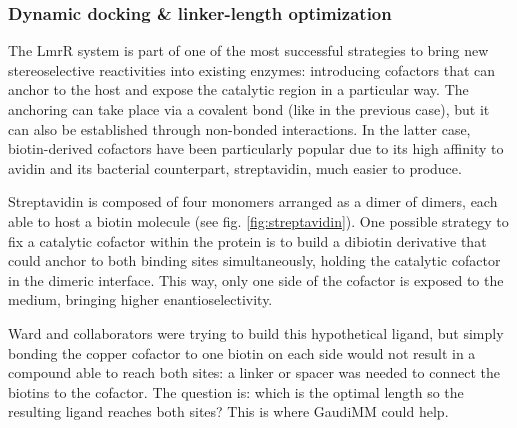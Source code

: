 \subsubsection{Dynamic docking \& linker-length optimization}
\label{section:dibiotin-linker-length-optimization}

The LmrR system is part of one of the most successful strategies to bring new stereoselective reactivities into existing enzymes: introducing cofactors that can anchor to the host and expose the catalytic region in a particular way. The anchoring can take place via a covalent bond (like in the previous case), but it can also be established through non-bonded interactions. In the latter case, biotin-derived cofactors have been particularly popular due to its high affinity to avidin and its bacterial counterpart, streptavidin, much easier to produce.

Streptavidin is composed of four monomers arranged as a dimer of dimers, each able to host a biotin molecule (see fig. \ref{fig:streptavidin}). One possible strategy to fix a catalytic cofactor within the protein is to build a dibiotin derivative that could anchor to both binding sites simultaneously, holding the catalytic cofactor in the dimeric interface. This way, only one side of the cofactor is exposed to the medium, bringing higher enantioselectivity.

Ward and collaborators were trying to build this hypothetical ligand, but simply bonding the copper cofactor to one biotin on each side would not result in a compound able to reach both sites: a linker or spacer was needed to connect the biotins to the cofactor. The question is: which is the optimal length so the resulting ligand reaches both sites? This is where GaudiMM could help.

